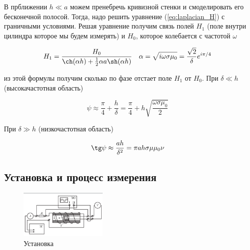 \documentclass[a4paper, 12pt]{article}
\begin{document}
	В прближении $h \ll a$ можем пренебречь кривизной стенки и смоделировать 
	его бесконечной полосой. Тогда, надо решить уравнение (\ref{eq:laplacian_H})
	с граничными условиями. Решая уравнение получим связь полей $H_1$ 
	(поле внутри цилиндра которое мы будем измерять) и $H_0$, которое колебается с частотой
	$\omega$
	
	\begin{equation}
		H_1 = \frac{H_0}{\ch(\alpha h) + \frac{1}{2} \alpha a \sh(\alpha h)} 
		\text{\ \ \ }
		\alpha = \sqrt{i\omega \sigma \mu_0} = \frac{\sqrt{2}}{\delta}e^{i\pi/4}
		\label{eq:svyaz_poley}
	\end{equation}
	
	из этой формулы получим сколько по фазе отстает поле $H_1$ от $H_0$. При $\delta \ll h$
	(высокачастотная область)
	
	\begin{equation}
		\psi \approx \frac{\pi}{4} + \frac{h}{\delta} = 
		\frac{\pi}{4} + h \sqrt{\frac{\omega \sigma \mu_0}{2}}
		\label{eq:faza_high_freq}
	\end{equation}
	
	При $\delta \gg h$ (низкочастотная область)
	
	\begin{equation}
		\tg \psi \approx \frac{ah}{\delta^2} = \pi a h \sigma \mu \mu_0 \nu
		\label{eq:faza_low_freq}
	\end{equation}
	
	\subsection*{Установка и процесс измерения}
	\begin{figure}
		\begin{center}
			\includegraphics[width=0.38\textwidth]{Снимок экрана 2024-11-30 032129.png}
		\end{center}
		\caption{Установка}\label{fig:ustanovka}
	\end{figure}
	
\end{document}
